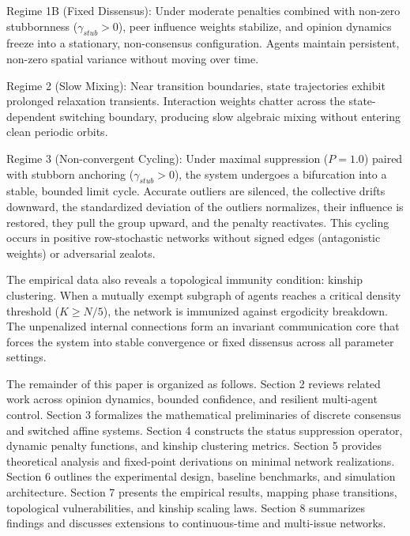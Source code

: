 Regime 1B (Fixed Dissensus): Under moderate penalties combined with non-zero stubbornness ($\gamma_{stub} > 0$), peer influence weights stabilize, and opinion dynamics freeze into a stationary, non-consensus configuration\cite{acemoglu2013opinion}. Agents maintain persistent, non-zero spatial variance without moving over time\cite{acemoglu2013opinion}.

Regime 2 (Slow Mixing): Near transition boundaries, state trajectories exhibit prolonged relaxation transients\cite{degroot1974reaching,acemoglu2013opinion}. Interaction weights chatter across the state-dependent switching boundary, producing slow algebraic mixing without entering clean periodic orbits\cite{acemoglu2013opinion,hajnal1958weak}.

Regime 3 (Non-convergent Cycling): Under maximal suppression ($P = 1.0$) paired with stubborn anchoring ($\gamma_{stub} > 0$), the system undergoes a bifurcation into a stable, bounded limit cycle\cite{degroot1974reaching,acemoglu2013opinion}. Accurate outliers are silenced, the collective drifts downward, the standardized deviation of the outliers normalizes, their influence is restored, they pull the group upward, and the penalty reactivates\cite{degroot1974reaching}. This cycling occurs in positive row-stochastic networks without signed edges (antagonistic weights) or adversarial zealots\cite{acemoglu2013opinion,hajnal1958weak}.

The empirical data also reveals a topological immunity condition: kinship clustering\cite{degroot1974reaching}. When a mutually exempt subgraph of agents reaches a critical density threshold ($K \ge N/5$), the network is immunized against ergodicity breakdown\cite{degroot1974reaching,acemoglu2013opinion}. The unpenalized internal connections form an invariant communication core that forces the system into stable convergence or fixed dissensus across all parameter settings\cite{degroot1974reaching,acemoglu2013opinion,hajnal1958weak}.

The remainder of this paper is organized as follows. Section 2 reviews related work across opinion dynamics, bounded confidence, and resilient multi-agent control\cite{degroot1974reaching}. Section 3 formalizes the mathematical preliminaries of discrete consensus and switched affine systems\cite{degroot1974reaching}. Section 4 constructs the status suppression operator, dynamic penalty functions, and kinship clustering metrics\cite{degroot1974reaching}. Section 5 provides theoretical analysis and fixed-point derivations on minimal network realizations\cite{degroot1974reaching}. Section 6 outlines the experimental design, baseline benchmarks, and simulation architecture\cite{degroot1974reaching}. Section 7 presents the empirical results, mapping phase transitions, topological vulnerabilities, and kinship scaling laws\cite{degroot1974reaching}. Section 8 summarizes findings and discusses extensions to continuous-time and multi-issue networks\cite{degroot1974reaching}.

